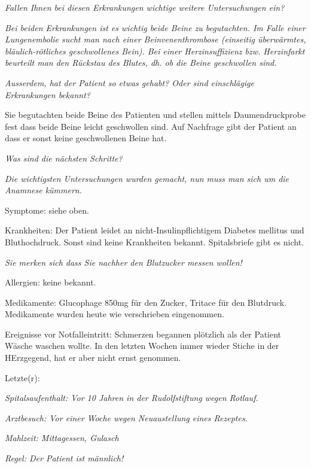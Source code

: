 \documentclass{article}
\newcommand\gH[1]{\textmd{\textcolor[rgb]{0.0,0.0,0.5019608}{#1}}}
\begin{document}
{\mdseries\itshape
Fallen Ihnen bei diesen Erkrankungen wichtige weitere Untersuchungen
ein?}

{\mdseries\itshape
\gH{Bei beiden Erkrankungen ist es wichtig beide Beine
zu begutachten. Im Falle einer Lungenembolie sucht man nach einer
Beinvenenthrombose (einseitig \"uberw\"armtes, bl\"aulich-r\"otliches
geschwollenes Bein). Bei einer Herzinsuffizienz bzw. Herzinfarkt
beurteilt man den R\"uckstau des Blutes, dh. ob die Beine geschwollen
sind.}}

{\mdseries\itshape
\gH{Ausserdem, hat der Patient so etwas gehabt? Oder
sind einschl\"agige Erkrankungen bekannt?  }}

{\mdseries
Sie begutachten beide Beine des Patienten und stellen mittels
Daumendruckprobe fest dass beide Beine leicht geschwollen sind. Auf
Nachfrage gibt der Patient an dass er sonst keine geschwollenen Beine
hat. }

{\mdseries\itshape
Was sind die n\"achsten Schritte?}

{\mdseries\itshape
\gH{Die wichtigsten Untersuchungen wurden gemacht, nun
muss man sich um die Anamnese k\"ummern. }}

{\mdseries
Symptome: siehe oben.}

{\mdseries
Krankheiten: Der Patient leidet an nicht-Insulinpflichtigem Diabetes
mellitus und Bluthochdruck. Sonst sind keine Krankheiten bekannt.
Spitalsbriefe gibt es nicht. }

{\mdseries\itshape
Sie merken sich dass Sie nachher den Blutzucker messen wollen!}

{\mdseries
Allergien: keine bekannt.}

{\mdseries
Medikamente: Glucophage 850mg f\"ur den Zucker, Tritace f\"ur den
Blutdruck. Medikamente wurden heute wie verschrieben eingenommen. }

{\mdseries
Ereignisse vor Notfalleintritt: Schmerzen begannen pl\"otzlich als der
Patient W\"asche waschen wollte. In den letzten Wochen immer wieder
Stiche in der HErzgegend, hat er aber nicht ernst genommen. }

{\mdseries
Letzte(r):}

{\mdseries\itshape
Spitalsaufenthalt: Vor 10 Jahren in der Rudolfstiftung wegen Rotlauf.}

{\mdseries\itshape
Arztbesuch: Vor einer Woche wegen Neuaustellung eines Rezeptes.}

{\mdseries\itshape
Mahlzeit: Mittagessen, Gulasch}

{\mdseries\itshape
Regel: Der Patient ist m\"annlich!}
\end{document}
